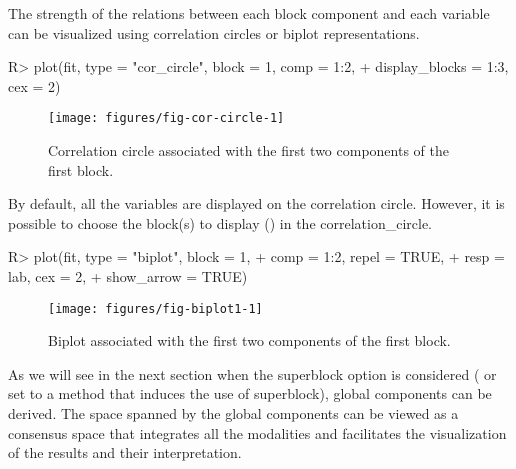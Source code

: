 \documentclass[
]{jss}
\begin{document}
\normalsize

The strength of the relations between each block component and each
variable can be visualized using correlation circles or biplot
representations.

\footnotesize

\begin{CodeChunk}
\begin{CodeInput}
R> plot(fit, type = "cor_circle", block = 1, comp = 1:2, 
+      display_blocks = 1:3, cex = 2)
\end{CodeInput}
\begin{figure}[H]

{\centering \texttt{[image: figures/fig-cor-circle-1]} 

}

\caption[Correlation circle associated with the first two components of the first block]{Correlation circle associated with the first two components of the first block.}\label{fig:fig-cor-circle}
\end{figure}
\end{CodeChunk}

\normalsize

By default, all the variables are displayed on the correlation circle.
However, it is possible to choose the block(s) to display
() in the correlation\_circle.

\footnotesize

\begin{CodeChunk}
\begin{CodeInput}
R> plot(fit, type = "biplot", block = 1, 
+      comp = 1:2, repel = TRUE, 
+      resp = lab, cex = 2,
+      show_arrow = TRUE)
\end{CodeInput}
\begin{figure}[H]

{\centering \texttt{[image: figures/fig-biplot1-1]} 

}

\caption[Biplot associated with the first two components of the first block]{Biplot associated with the first two components of the first block.}\label{fig:fig-biplot1}
\end{figure}
\end{CodeChunk}

\normalsize

As we will see in the next section when the superblock option is
considered ( or  set to a method
that induces the use of superblock), global components can be derived.
The space spanned by the global components can be viewed as a consensus
space that integrates all the modalities and facilitates the
visualization of the results and their interpretation.
\end{document}
